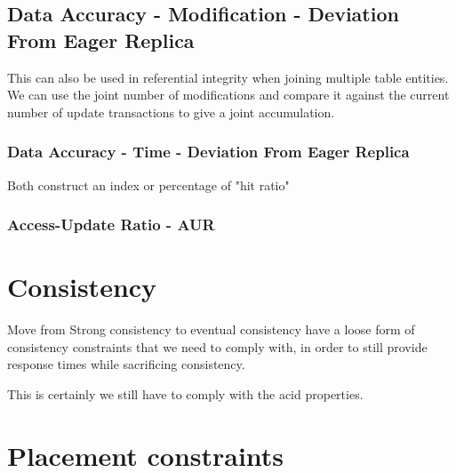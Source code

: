 \subsection{Data Accuracy - Modification - Deviation From Eager Replica}
This can also be used in referential integrity when joining multiple table entities.
We can use the joint number of modifications and compare it against the current number of update transactions to give a joint accumulation.


\subsubsection{Data Accuracy - Time -  Deviation From Eager Replica}

Both construct an index or percentage of "hit ratio"

\subsubsection{Access-Update Ratio - AUR}




\section{Consistency}
Move from Strong consistency to eventual consistency 
have a loose form of consistency constraints that we need to comply with, in order to still provide response times while sacrificing consistency.



This is certainly we still have to comply with the acid properties. 

\section{Placement constraints}